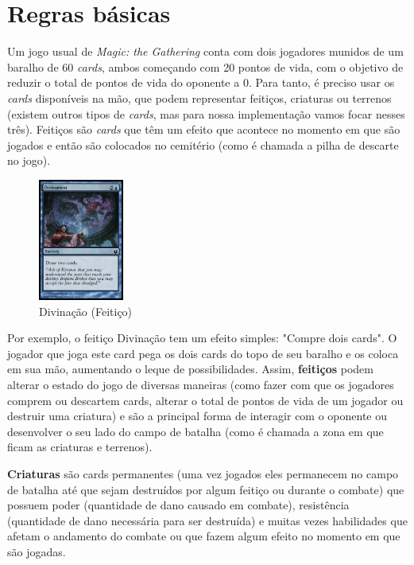 \documentclass{book}
\begin{document}
\section{Regras básicas}

Um jogo usual de \textit{Magic: the Gathering} conta com dois jogadores munidos de um baralho de 60 \textit{cards}, ambos começando com 20 pontos de vida, com o objetivo de reduzir o total de pontos de vida do oponente a 0. Para tanto, é preciso usar os \textit{cards} disponíveis na mão, que podem representar feitiços, criaturas ou terrenos (existem outros tipos de \textit{cards}, mas para nossa implementação vamos focar nesses três). Feitiços são \textit{cards} que têm um efeito que acontece no momento em que são jogados e então são colocados no cemitério (como é chamada a pilha de descarte no jogo).\\

\begin{figure}
    \centering
    \includegraphics[width=0.25\textwidth]{picstcc/divination.jpg}
    \caption{Divinação (Feitiço)}
    \label{divination}
\end{figure}

Por exemplo, o feitiço Divinação tem um efeito simples: "Compre dois cards". O jogador que joga este card pega os dois cards do topo de seu baralho e os coloca em sua mão, aumentando o leque de possibilidades. Assim, \textbf{feitiços} podem alterar o estado do jogo de diversas maneiras (como fazer com que os jogadores comprem ou descartem cards, alterar o total de pontos de vida de um jogador ou destruir uma criatura) e são a principal forma de interagir com o oponente ou desenvolver o seu lado do campo de batalha (como é chamada a zona em que ficam as criaturas e terrenos).

\textbf{Criaturas} são cards permanentes (uma vez jogados eles permanecem no campo de batalha até que sejam destruídos por algum feitiço ou durante o combate) que possuem poder (quantidade de dano causado em combate), resistência (quantidade de dano necessária para ser destruída) e muitas vezes habilidades que afetam o andamento do combate ou que fazem algum efeito no momento em que são jogadas.
\end{document}

